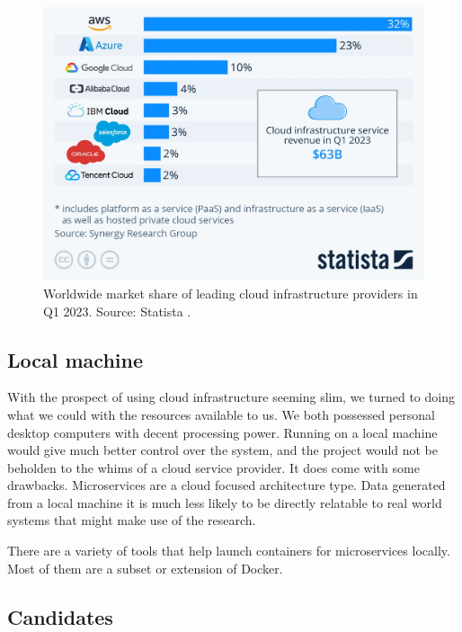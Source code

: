 \begin{figure}
    \centering
    \includegraphics[width=\columnwidth]{Figures/Graphs/Cloud_market_share.jpeg}
    \caption{Worldwide market share of leading cloud infrastructure providers in Q1 2023. Source: Statista \cite*{Richter}.}
    \label{Cloud market share}
\end{figure}

\subsection{Local machine}
With the prospect of using cloud infrastructure seeming slim, we turned to doing what we could with the resources available to us. We both possessed personal desktop computers with decent processing power.
Running on a local machine would give much better control over the system, and the project would not be beholden to the whims of a cloud service provider.
It does come with some drawbacks. Microservices are a cloud focused architecture type. Data generated from a local machine it is much less likely to be directly relatable to real world systems that might make use of the research.

There are a variety of tools that help launch containers for microservices locally. Most of them are a subset or extension of Docker.

\subsection{Candidates}
